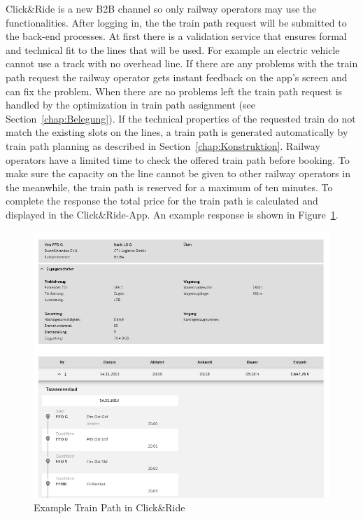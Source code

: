 Click\&Ride is a new B2B channel so only railway operators may use the functionalities. After logging in, the the train path request will be submitted to the back-end processes. At first there is a validation service that ensures formal and technical fit to the lines that will be used. For example an electric vehicle cannot use a track with no overhead line. If there are any problems with the train path request the railway operator gets instant feedback on the app's screen and can fix the problem. When there are no problems left the train path request is handled by the optimization in train path assignment (see Section~\ref{chap:Belegung}). If the technical properties of the requested train do not match the existing slots on the lines, a train path is generated automatically by train path planning as described in Section~\ref{chap:Konstruktion}. Railway operators have a limited time to check the offered train path before booking. To make sure the capacity on the line cannot be given to other railway operators in the meanwhile, the train path is reserved for a maximum of ten minutes. To complete the response the total price for the train path is calculated and displayed in the Click\&Ride-App. An example response is shown in Figure~\ref{fig:CnR_response}.
\begin{figure}[htb]
	\centering
	\includegraphics[width=\textwidth]{Bilder/train_path.jpg}
	\caption{Example Train Path in Click\&Ride}
	\label{fig:CnR_response}
\end{figure}

